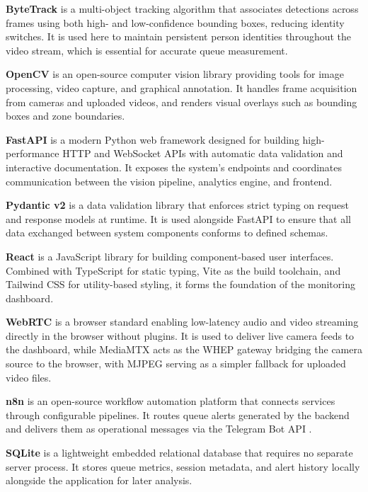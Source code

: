 \textbf{ByteTrack} \cite{bytetrack2022} is a multi-object tracking algorithm that associates detections across frames using both high- and low-confidence bounding boxes, reducing identity switches. It is used here to maintain persistent person identities throughout the video stream, which is essential for accurate queue measurement.

\textbf{OpenCV} \cite{opencv_docs} is an open-source computer vision library providing tools for image processing, video capture, and graphical annotation. It handles frame acquisition from cameras and uploaded videos, and renders visual overlays such as bounding boxes and zone boundaries.

\textbf{FastAPI} \cite{fastapi_docs} is a modern Python web framework designed for building high-performance HTTP and WebSocket APIs with automatic data validation and interactive documentation. It exposes the system's endpoints and coordinates communication between the vision pipeline, analytics engine, and frontend.

\textbf{Pydantic v2} \cite{pydantic_docs} is a data validation library that enforces strict typing on request and response models at runtime. It is used alongside FastAPI to ensure that all data exchanged between system components conforms to defined schemas.

\textbf{React} \cite{react_docs} is a JavaScript library for building component-based user interfaces. Combined with TypeScript \cite{typescript_docs} for static typing, Vite \cite{vite_docs} as the build toolchain, and Tailwind CSS \cite{tailwind_docs} for utility-based styling, it forms the foundation of the monitoring dashboard.

\textbf{WebRTC} \cite{webrtc_w3c} is a browser standard enabling low-latency audio and video streaming directly in the browser without plugins. It is used to deliver live camera feeds to the dashboard, while MediaMTX \cite{mediamtx_docs} acts as the WHEP gateway bridging the camera source to the browser, with MJPEG serving as a simpler fallback for uploaded video files.

\textbf{n8n} \cite{n8n_docs} is an open-source workflow automation platform that connects services through configurable pipelines. It routes queue alerts generated by the backend and delivers them as operational messages via the Telegram Bot API \cite{telegram_bot_api}.

\textbf{SQLite} \cite{sqlite_docs} is a lightweight embedded relational database that requires no separate server process. It stores queue metrics, session metadata, and alert history locally alongside the application for later analysis.

